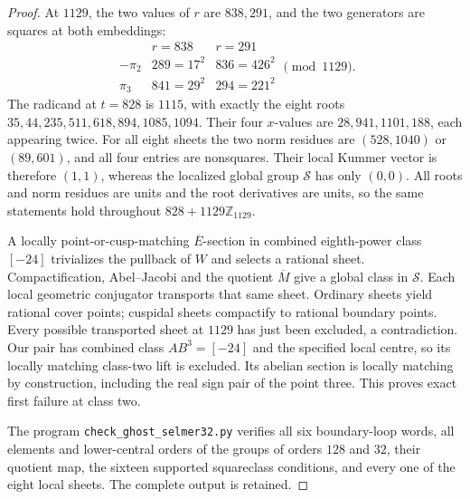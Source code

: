\begin{proof}
At \(1129\), the two values of \(r\) are \(838,291\), and
the two generators are squares at both embeddings:
\[
\begin{array}{c|cc}
 &r=838&r=291\\\hline
 -\pi_2&289=17^2&836=426^2\\
 \pi_3&841=29^2&294=221^2
\end{array}\pmod{1129}.
\]
The radicand at \(t=828\) is \(1115\), with exactly the eight
roots \(35,\allowbreak44,\allowbreak235,\allowbreak511,\allowbreak618,\allowbreak894,\allowbreak1085,\allowbreak1094\). Their four
\(x\)-values are \(28,941,1101,188\), each appearing twice.
For all eight sheets the two norm residues are
\((528,1040)\) or \((89,601)\), and all four entries are
nonsquares. Their local Kummer vector is therefore \((1,1)\),
whereas the localized global group \(\mathcal S\) has only
\((0,0)\). All roots and norm residues are units and the root
derivatives are units, so the same statements hold throughout
\(828+1129\mathbb Z_{1129}\).

A locally point-or-cusp-matching \(\overline E\)-section in
combined eighth-power class \([-24]\) trivializes the pullback
of \(W\) and selects a rational sheet. Compactification,
Abel--Jacobi and the quotient \(\overline M\) give a global
class in \(\mathcal S\). Each local geometric conjugator
transports that same sheet. Ordinary sheets yield rational cover
points; cuspidal sheets compactify to rational boundary points.
Every possible transported sheet at \(1129\) has just been
excluded, a contradiction. Our pair has combined class
\(AB^3=[-24]\) and the specified local centre, so its locally
matching class-two lift is excluded. Its abelian section is
locally matching by construction, including the real sign pair
of the point three. This proves exact first failure at class two.

The program \texttt{check\_ghost\_selmer32.py} verifies all
six boundary-loop words, all elements and lower-central orders of
the groups of orders \(128\) and \(32\), their quotient map,
the sixteen supported squareclass conditions, and every one of
the eight local sheets. The complete output is retained.
\end{proof}

